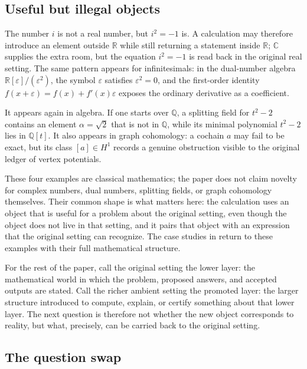 \documentclass[11pt]{article}
\newcommand{\R}{\mathbb R}
\providecommand{\C}{}
\renewcommand{\C}{\mathbb C}
\newcommand{\Dual}{\R[\varepsilon]/(\varepsilon^2)}
\theoremstyle{definition}
\begin{document}
\subsection{Useful but illegal objects}
\label{subsec:intro-illegal-objects}

The number $i$ is not a real number, but $i^2=-1$ is.  A calculation may
therefore introduce an element outside \(\R\) while still returning a statement
inside \(\R\); \(\C\) supplies the extra room, but the equation \(i^2=-1\) is
read back in the original real setting.  The same pattern appears for
infinitesimals: in the dual-number algebra \(\Dual\), the symbol
\(\varepsilon\) satisfies \(\varepsilon^2=0\), and the first-order identity
\(f(x+\varepsilon)=f(x)+f'(x)\varepsilon\) exposes the ordinary derivative as a
coefficient.

It appears again in algebra.  If one starts over \(\mathbb Q\), a splitting
field for \(t^2-2\) contains an element \(\alpha=\sqrt 2\) that is not in
\(\mathbb Q\), while its minimal polynomial \(t^2-2\) lies in
\(\mathbb Q[t]\).  It also appears in graph cohomology: a cochain \(a\) may
fail to be exact, but its class \([a]\in H^1\) records a genuine obstruction
visible to the original ledger of vertex potentials.

These four examples are classical mathematics; the paper does not claim
novelty for complex numbers, dual numbers, splitting fields, or graph
cohomology themselves.  Their common shape is what matters here: the
calculation uses an object that is useful for a problem about the original
setting, even though the object does not live in that setting, and it pairs
that object with an expression that the original setting can recognize.  The
case studies in 
return to these examples with their full mathematical structure.

For the rest of the paper, call the original setting the lower layer: the
mathematical world in which the problem, proposed answers, and accepted
outputs are stated.  Call the richer ambient setting the promoted layer: the
larger structure introduced to compute, explain, or certify something about
that lower layer.  The next question is therefore not whether the new object
corresponds to reality, but what, precisely, can be carried back to the
original setting.

\subsection{The question swap}
\label{subsec:intro-question-swap}
\end{document}
